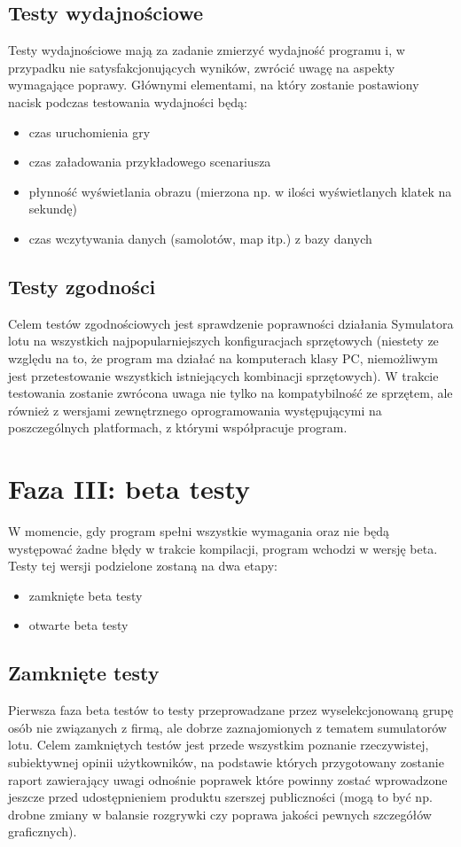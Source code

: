\documentclass{mwrep}
\begin{document}
\section{Testy wydajnościowe}
Testy wydajnościowe mają za zadanie zmierzyć wydajność programu i, w przypadku nie satysfakcjonujących wyników, zwrócić uwagę na aspekty wymagające poprawy. Głównymi elementami, na który zostanie postawiony nacisk podczas testowania wydajności będą:
\begin{itemize}
\item czas uruchomienia gry
\item czas załadowania przykładowego scenariusza
\item płynność wyświetlania obrazu (mierzona np. w ilości wyświetlanych klatek na sekundę)
\item czas wczytywania danych (samolotów, map itp.) z bazy danych
\end{itemize}

\section{Testy zgodności}
Celem testów zgodnościowych jest sprawdzenie poprawności działania Symulatora lotu na wszystkich najpopularniejszych konfiguracjach sprzętowych (niestety ze względu na to, że program ma działać na komputerach klasy PC, niemożliwym jest przetestowanie wszystkich istniejących kombinacji sprzętowych). W trakcie testowania zostanie zwrócona uwaga nie tylko na kompatybilność ze sprzętem, ale również z wersjami zewnętrznego oprogramowania występującymi na poszczególnych platformach, z którymi współpracuje program.

\chapter{Faza III: beta testy}
W momencie, gdy program spełni wszystkie wymagania oraz nie będą występować żadne błędy w trakcie kompilacji, program wchodzi w wersję beta. Testy tej wersji podzielone zostaną na dwa etapy:
\begin{itemize}
\item zamknięte beta testy
\item otwarte beta testy
\end{itemize}

\section{Zamknięte testy}
Pierwsza faza beta testów to testy przeprowadzane przez wyselekcjonowaną grupę osób nie związanych z firmą, ale dobrze zaznajomionych z tematem sumulatorów lotu. Celem zamkniętych testów jest przede wszystkim poznanie rzeczywistej, subiektywnej opinii użytkowników, na podstawie których przygotowany zostanie raport zawierający uwagi odnośnie poprawek które powinny zostać wprowadzone jeszcze przed udostępnieniem produktu szerszej publiczności (mogą to być np. drobne zmiany w balansie rozgrywki czy poprawa jakości pewnych szczegółów graficznych).
\end{document}
